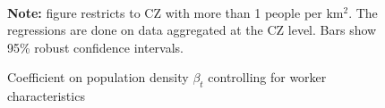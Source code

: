 \begin{figure}[!h]
\centering
\caption{Coefficient on population density $ \beta_t $ controlling for worker characteristics}
  \\ 
\par \begin{minipage}[h]{\textwidth}{\scriptsize\textbf{Note:} figure restricts to CZ with more than 1 people per km$^2$. The regressions are done on data aggregated at the CZ level. Bars show 95\% robust confidence intervals.}\end{minipage}
\end{figure}
